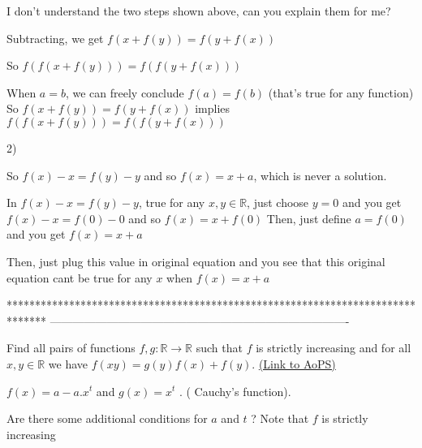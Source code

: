 \begin{solution}
	\begin{tcolorbox}I don't understand the two steps shown above, can you explain them for me?\end{tcolorbox}

\begin{tcolorbox}
Subtracting, we get $f(x+f(y))=f(y+f(x))$

So $f(f(x+f(y)))=f(f(y+f(x)))$\end{tcolorbox}
When $a=b$, we can freely conclude $f(a)=f(b)$ (that's true for any function)
So $f(x+f(y))=f(y+f(x))$ implies $f(f(x+f(y)))=f(f(y+f(x)))$

2)
\begin{tcolorbox}
So $f(x)-x=f(y)-y$ and so $f(x)=x+a$, which is never a solution.
\end{tcolorbox}

In $f(x)-x=f(y)-y$, true for any $x,y\in\mathbb R$, just choose $y=0$ and you get $f(x)-x=f(0)-0$ and so $f(x)=x+f(0)$
Then, just define $a=f(0)$ and you get $f(x)=x+a$

Then, just plug this value in original equation and you see that this original equation cant be true for any $x$ when $f(x)=x+a$
\end{solution}
*******************************************************************************
-------------------------------------------------------------------------------

\begin{problem}
	Find all pairs of functions $f,g: \mathbb R \to \mathbb R$ such that $f$ is strictly increasing and for all $x,y \in \mathbb R$ we have $f(xy)=g(y)f(x)+f(y)$.
	\flushright \href{https://artofproblemsolving.com/community/c6h438683}{(Link to AoPS)}
\end{problem}



\begin{solution}
	$f(x)= a - a.x^t$ and $g(x)=x^t$  . ( Cauchy's function).
\end{solution}



\begin{solution}
	Are there some additional conditions for $a$ and $t$ ? Note that $f$ is strictly increasing
\end{solution}



